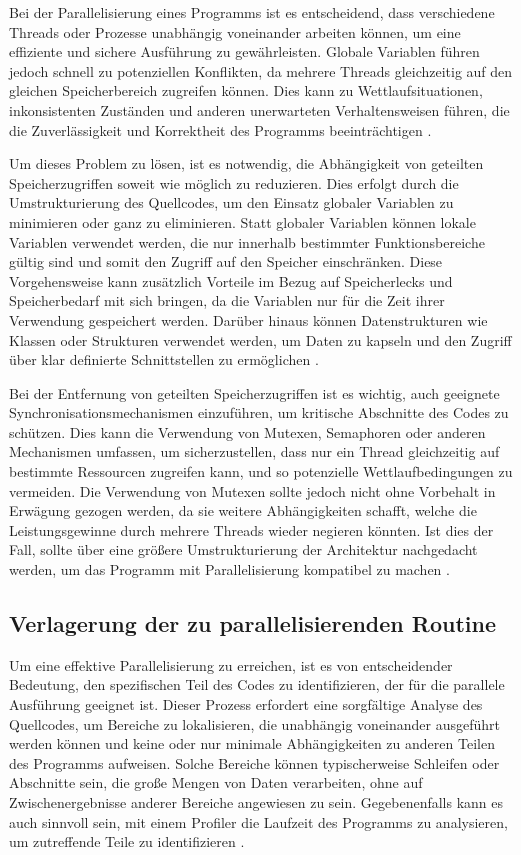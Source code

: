 Bei der Parallelisierung eines Programms ist es entscheidend, dass verschiedene Threads oder Prozesse unabhängig voneinander arbeiten können, um eine effiziente und sichere Ausführung zu gewährleisten. Globale Variablen führen jedoch schnell zu potenziellen Konflikten, da mehrere Threads gleichzeitig auf den gleichen Speicherbereich zugreifen können. Dies kann zu Wettlaufsituationen, inkonsistenten Zuständen und anderen unerwarteten Verhaltensweisen führen, die die Zuverlässigkeit und Korrektheit des Programms beeinträchtigen \citep{Czech_2017_Shared_Memory}.

Um dieses Problem zu lösen, ist es notwendig, die Abhängigkeit von geteilten Speicherzugriffen soweit wie möglich zu reduzieren. Dies erfolgt durch die Umstrukturierung des Quellcodes, um den Einsatz globaler Variablen zu minimieren oder ganz zu eliminieren. Statt globaler Variablen können lokale Variablen verwendet werden, die nur innerhalb bestimmter Funktionsbereiche gültig sind und somit den Zugriff auf den Speicher einschränken. Diese Vorgehensweise kann zusätzlich Vorteile im Bezug auf Speicherlecks und Speicherbedarf mit sich bringen, da die Variablen nur für die Zeit ihrer Verwendung gespeichert werden. Darüber hinaus können Datenstrukturen wie Klassen oder Strukturen verwendet werden, um Daten zu kapseln und den Zugriff über klar definierte Schnittstellen zu ermöglichen \citep{Czech_2017_Shared_Memory}.

Bei der Entfernung von geteilten Speicherzugriffen ist es wichtig, auch geeignete Synchronisationsmechanismen einzuführen, um kritische Abschnitte des Codes zu schützen. Dies kann die Verwendung von Mutexen, Semaphoren oder anderen Mechanismen umfassen, um sicherzustellen, dass nur ein Thread gleichzeitig auf bestimmte Ressourcen zugreifen kann, und so potenzielle Wettlaufbedingungen zu vermeiden. Die Verwendung von Mutexen sollte jedoch nicht ohne Vorbehalt in Erwägung gezogen werden, da sie weitere Abhängigkeiten schafft, welche die Leistungsgewinne durch mehrere Threads wieder negieren könnten. Ist dies der Fall, sollte über eine größere Umstrukturierung der Architektur nachgedacht werden, um das Programm mit Parallelisierung kompatibel zu machen \citep{Czech_2017_Shared_Memory}.

\subsection{Verlagerung der zu parallelisierenden Routine}
\label{sec:Verlagerung_parallelisierende_Routine}
Um eine effektive Parallelisierung zu erreichen, ist es von entscheidender Bedeutung, den spezifischen Teil des Codes zu identifizieren, der für die parallele Ausführung geeignet ist. Dieser Prozess erfordert eine sorgfältige Analyse des Quellcodes, um Bereiche zu lokalisieren, die unabhängig voneinander ausgeführt werden können und keine oder nur minimale Abhängigkeiten zu anderen Teilen des Programms aufweisen. Solche Bereiche können typischerweise Schleifen oder Abschnitte sein, die große Mengen von Daten verarbeiten, ohne auf Zwischenergebnisse anderer Bereiche angewiesen zu sein. Gegebenenfalls kann es auch sinnvoll sein, mit einem Profiler die Laufzeit des Programms zu analysieren, um zutreffende Teile zu identifizieren \citep{wilkinson2006parallel}.

